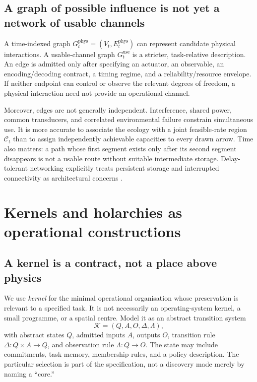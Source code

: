 \documentclass[11pt,a4paper]{article}
\theoremstyle{definition}
\theoremstyle{remark}
\newcommand{\calK}{\mathcal{K}}
\begin{document}
\subsection{A graph of possible influence is not yet a network of usable channels}
A time-indexed graph $G_t^{\mathrm{phys}}=(V_t,E_t^{\mathrm{phys}})$ can represent candidate physical interactions. A usable-channel graph $G_t^{\mathrm{use}}$ is a stricter, task-relative description. An edge is admitted only after specifying an actuator, an observable, an encoding/decoding contract, a timing regime, and a reliability/resource envelope. If neither endpoint can control or observe the relevant degrees of freedom, a physical interaction need not provide an operational channel.

Moreover, edges are not generally independent. Interference, shared power, common transducers, and correlated environmental failure constrain simultaneous use. It is more accurate to associate the ecology with a joint feasible-rate region $\mathscr C_t$ than to assign independently achievable capacities to every drawn arrow. Time also matters: a path whose first segment exists only after its second segment disappears is not a usable route without suitable intermediate storage. Delay-tolerant networking explicitly treats persistent storage and interrupted connectivity as architectural concerns \citep{dtn}.

\section{Kernels and holarchies as operational constructions}\label{sec:kernel}
\subsection{A kernel is a contract, not a place above physics}
We use \emph{kernel} for the minimal operational organisation whose preservation is relevant to a specified task. It is not necessarily an operating-system kernel, a small programme, or a spatial centre. Model it as an abstract transition system
\begin{equation}\label{eq:kernel}
 \calK=(Q,A,O,\Delta,\Lambda),
\end{equation}
with abstract states $Q$, admitted inputs $A$, outputs $O$, transition rule $\Delta:Q\times A\to Q$, and observation rule $\Lambda:Q\to O$. The state may include commitments, task memory, membership rules, and a policy description. The particular selection is part of the specification, not a discovery made merely by naming a ``core.''
\end{document}
